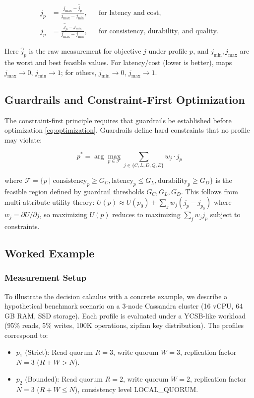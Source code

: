 \documentclass[conference]{IEEEtran}
\begin{document}
\begin{equation}
\begin{aligned}
j_p &= \frac{j_{\max}-\hat{j}_p}{j_{\max}-j_{\min}},
&& \text{for latency and cost,} \\
j_p &= \frac{\hat{j}_p-j_{\min}}{j_{\max}-j_{\min}},
&& \text{for consistency, durability, and quality.}
\end{aligned}
\label{eq:normalization}
\end{equation}

Here $\hat{j}_p$ is the raw measurement for objective $j$ under profile $p$, and $j_{\text{min}}, j_{\text{max}}$ are the worst and best feasible values. For latency/cost (lower is better), maps $j_{\max} \to 0$, $j_{\min} \to 1$; for others, $j_{\min} \to 0$, $j_{\max} \to 1$.

\subsection{Guardrails and Constraint-First Optimization}

The constraint-first principle requires that guardrails be established before optimization \eqref{eq:optimization}. Guardrails define hard constraints that no profile may violate:

\begin{equation}
p^* = \arg\max_{p \in \mathcal{F}} \sum_{j \in \{C,L,D,Q,E\}} w_j \cdot j_p
\label{eq:optimization}
\end{equation}

where $\mathcal{F} = \{p \mid \text{consistency}_p \geq G_C, \text{latency}_p \leq G_L, \text{durability}_p \geq G_D\}$ is the feasible region defined by guardrail thresholds $G_C, G_L, G_D$. This follows from multi-attribute utility theory: $U(p) \approx U(p_0) + \sum_j w_j (j_p - j_{p_0})$ where $w_j = \partial U/\partial j$, so maximizing $U(p)$ reduces to maximizing $\sum_j w_j j_p$ subject to constraints.

\subsection{Worked Example}

\subsubsection{Measurement Setup}
To illustrate the decision calculus with a concrete example, we describe a hypothetical benchmark scenario on a 3-node Cassandra cluster (16 vCPU, 64 GB RAM, SSD storage). Each profile is evaluated under a YCSB-like workload (95\% reads, 5\% writes, 100K operations, zipfian key distribution). The profiles correspond to:
\begin{itemize}
    \item $p_1$ (Strict): Read quorum $R=3$, write quorum $W=3$, replication factor $N=3$ ($R+W > N$).
    \item $p_2$ (Bounded): Read quorum $R=2$, write quorum $W=2$, replication factor $N=3$ ($R+W \leq N$), consistency level LOCAL\_QUORUM.
\end{itemize}
\end{document}
